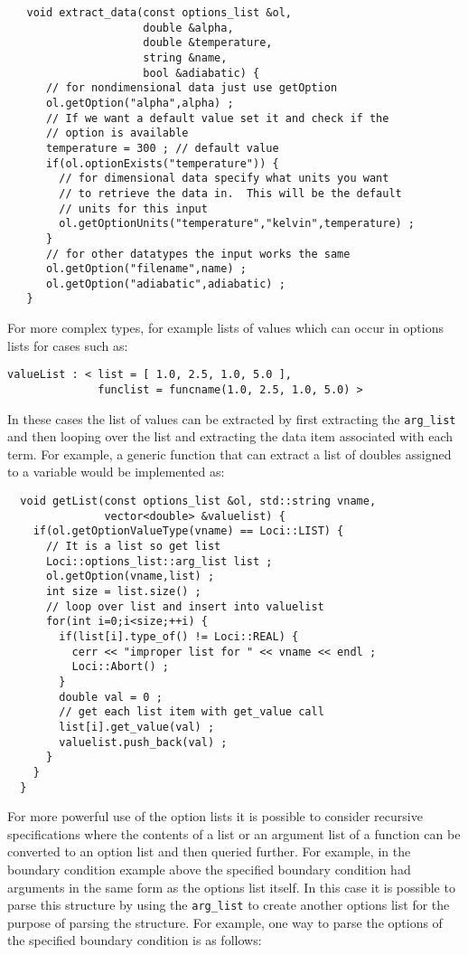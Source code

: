 \begin{verbatim}
   void extract_data(const options_list &ol,
                     double &alpha,
                     double &temperature,
                     string &name,
                     bool &adiabatic) {
      // for nondimensional data just use getOption
      ol.getOption("alpha",alpha) ; 
      // If we want a default value set it and check if the
      // option is available
      temperature = 300 ; // default value
      if(ol.optionExists("temperature")) {
        // for dimensional data specify what units you want
        // to retrieve the data in.  This will be the default
        // units for this input
        ol.getOptionUnits("temperature","kelvin",temperature) ;
      }
      // for other datatypes the input works the same
      ol.getOption("filename",name) ;
      ol.getOption("adiabatic",adiabatic) ;
   }
\end{verbatim}

For more complex types, for example lists of values which can occur in
options lists for cases such as:
\begin{verbatim}
valueList : < list = [ 1.0, 2.5, 1.0, 5.0 ],
              funclist = funcname(1.0, 2.5, 1.0, 5.0) >
\end{verbatim}
In these cases the list of values can be extracted by first extracting
the {\tt arg\_list} and then looping over the list and extracting the 
data item associated with each term.  For example, a generic function
that can extract a list of doubles assigned to a variable would be
implemented as:
\begin{verbatim}
  void getList(const options_list &ol, std::string vname,
               vector<double> &valuelist) {
    if(ol.getOptionValueType(vname) == Loci::LIST) {
      // It is a list so get list
      Loci::options_list::arg_list list ;
      ol.getOption(vname,list) ;
      int size = list.size() ;
      // loop over list and insert into valuelist
      for(int i=0;i<size;++i) {
        if(list[i].type_of() != Loci::REAL) {
          cerr << "improper list for " << vname << endl ;
          Loci::Abort() ;
        }
        double val = 0 ;
        // get each list item with get_value call
        list[i].get_value(val) ;
        valuelist.push_back(val) ;
      }
    }
  }
\end{verbatim}

For more powerful use of the option lists it is possible to consider
recursive specifications where the contents of a list or an argument
list of a function can be converted to an option list and then queried
further.  For example, in the boundary condition example above the
specified boundary condition had arguments in the same form as the
options list itself.  In this case it is possible to parse this
structure by using the {\tt arg\_list} to create another options list
for the purpose of parsing the structure.  For example, one way to
parse the options of the specified boundary condition is as follows:

